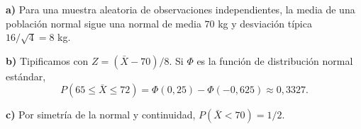 \textbf{a)} Para una muestra aleatoria de observaciones independientes, la media de una población normal sigue una normal de media $70$ kg y desviación típica $16/\sqrt4=8$ kg.

\textbf{b)} Tipificamos con $Z=(\bar X-70)/8$. Si $\Phi$ es la función de distribución normal estándar,
\[
P(65\le\bar X\le72)=\Phi(0{,}25)-\Phi(-0{,}625)\approx\boxed{0{,}3327}.
\]

\textbf{c)} Por simetría de la normal y continuidad, $P(\bar X<70)=\boxed{1/2}$.
